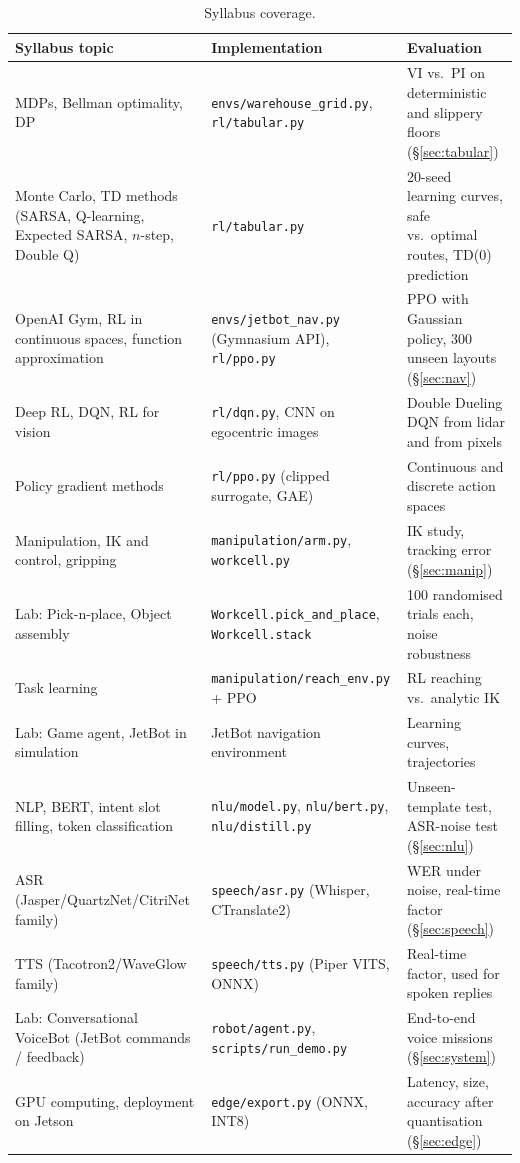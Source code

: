 \documentclass[11pt,a4paper]{article}
\begin{document}
\begin{table}[H]
\centering\small
\caption{Syllabus coverage.}\label{tab:syllabus}
\begin{tabular}{p{4.5cm}p{5.5cm}p{5.1cm}}
\toprule
Syllabus topic & Implementation & Evaluation \\
\midrule
MDPs, Bellman optimality, DP & \texttt{envs/warehouse\_grid.py}, \texttt{rl/tabular.py} & VI vs.\ PI on deterministic and slippery floors (\S\ref{sec:tabular}) \\
Monte Carlo, TD methods (SARSA, Q-learning, Expected SARSA, $n$-step, Double Q) & \texttt{rl/tabular.py} & 20-seed learning curves, safe vs.\ optimal routes, TD(0) prediction \\
OpenAI Gym, RL in continuous spaces, function approximation & \texttt{envs/jetbot\_nav.py} (Gymnasium API), \texttt{rl/ppo.py} & PPO with Gaussian policy, 300 unseen layouts (\S\ref{sec:nav}) \\
Deep RL, DQN, RL for vision & \texttt{rl/dqn.py}, CNN on egocentric images & Double Dueling DQN from lidar and from pixels \\
Policy gradient methods & \texttt{rl/ppo.py} (clipped surrogate, GAE) & Continuous and discrete action spaces \\
Manipulation, IK and control, gripping & \texttt{manipulation/arm.py}, \texttt{workcell.py} & IK study, tracking error (\S\ref{sec:manip}) \\
Lab: Pick-n-place, Object assembly & \texttt{Workcell.pick\_and\_place}, \texttt{Workcell.stack} & 100 randomised trials each, noise robustness \\
Task learning & \texttt{manipulation/reach\_env.py} + PPO & RL reaching vs.\ analytic IK \\
Lab: Game agent, JetBot in simulation & JetBot navigation environment & Learning curves, trajectories \\
NLP, BERT, intent slot filling, token classification & \texttt{nlu/model.py}, \texttt{nlu/bert.py}, \texttt{nlu/distill.py} & Unseen-template test, ASR-noise test (\S\ref{sec:nlu}) \\
ASR (Jasper/QuartzNet/CitriNet family) & \texttt{speech/asr.py} (Whisper, CTranslate2) & WER under noise, real-time factor (\S\ref{sec:speech}) \\
TTS (Tacotron2/WaveGlow family) & \texttt{speech/tts.py} (Piper VITS, ONNX) & Real-time factor, used for spoken replies \\
Lab: Conversational VoiceBot (JetBot commands / feedback) & \texttt{robot/agent.py}, \texttt{scripts/run\_demo.py} & End-to-end voice missions (\S\ref{sec:system}) \\
GPU computing, deployment on Jetson & \texttt{edge/export.py} (ONNX, INT8) & Latency, size, accuracy after quantisation (\S\ref{sec:edge}) \\
\bottomrule
\end{tabular}
\end{table}
\end{document}
